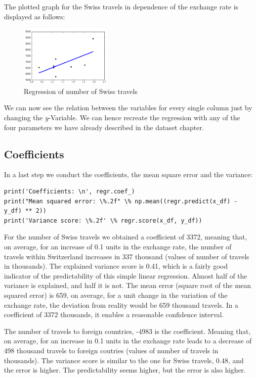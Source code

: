 \documentclass[12pt,a4paper,bibliography=totocnumbered,listof=totocnumbered]{scrartcl}
\begin{document}
The plotted graph for the Swiss travels in dependence of the exchange rate is displayed as follows: 
\begin{figure}[htbp] 
  \centering
     \includegraphics[width=0.4\textwidth]{lr_swiss_travels.png}
  \caption{Regression of number of Swiss travels}
  \label{fig: figure3}
\end{figure}

We can now see the relation between the variables for every single column just by changing the \textit{y}-Variable. We can hence recreate the regression with any of the four parameters we have already described in the dataset chapter. 

\subsection{Coefficients}
In a last step we conduct the coefficients, the mean square error and the variance:
\begin{verbatim}
print('Coefficients: \n', regr.coef_)
print("Mean squared error: \%.2f" \% np.mean((regr.predict(x_df) - y_df) ** 2))
print('Variance score: \%.2f' \% regr.score(x_df, y_df))
\end{verbatim}


For the number of Swiss travels we obtained a coefficient of 3372, meaning that, on average, for an increase of 0.1 units in the exchange rate, the number of travels within Switzerland increases in 337 thousand (values of number of travels in thousands). The explained variance score is 0.41, which is a fairly good indicator of the predictability of this simple linear regression. Almost half of the variance is explained, and half it is not. The mean error (square root of the mean squared error) is 659, on average, for a unit change in the  variation of the exchange rate, the deviation from reality would be 659 thousand travels. In a coefficient of 3372 thousands, it enables a reasonable confidence interval. 

The number of travels to foreign countries, -4983 is the coefficient. Meaning that, on average, for an increase in 0.1 units in the exchange rate leads to a decrease of 498 thousand travels to foreign coutries (values of number of travels in thousands). The variance score is similar to the one for Swiss travels, 0.48, and the error is higher. The predictability seems higher, but the error is also higher. 
\end{document}
